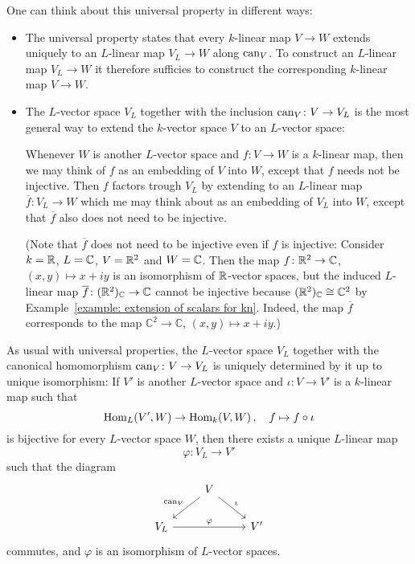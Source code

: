 \begin{remark}
  One can think about this universal property in different ways:
  \begin{itemize}
    \item
      The universal property states that every $k$-linear map $V \to W$ extends uniquely to an $L$-linear map $V_L \to W$ along $\operatorname{can}_V$.
      To construct an $L$-linear map $V_L \to W$ it therefore sufficies to construct the corresponding $k$-linear map $V \to W$.
    \item
      The $L$-vector space $V_L$ together with the inclusion $\operatorname{can}_V \colon V \to V_L$ is the most general way to extend the $k$-vector space $V$ to an $L$-vector space:
      
      Whenever $W$ is another $L$-vector space and $f \colon V \to W$ is a $k$-linear map, then we may think of $f$ as an embedding of $V$ into $W$, except that $f$ needs not be injective.
      Then $f$ factors trough $V_L$ by extending to an $L$-linear map $\overline{f} \colon V_L \to W$ which me may think about as an embedding of $V_L$ into $W$, except that $\overline{f}$ also does not need to be injective.
      
      (Note that $\overline{f}$ does not need to be injective even if $f$ is injective:
      Consider $k = \mathbb{R}$, $L = \mathbb{C}$, $V = \mathbb{R}^2$ and $W = \mathbb{C}$.
      Then the map $f \colon \mathbb{R}^2 \to \mathbb{C}$, $(x,y) \mapsto x + iy$ is an isomorphism of $\mathbb{R}$-vector spaces, but the induced $L$-linear map $\overline{f} \colon (\mathbb{R}^2)_{\mathbb{C}} \to \mathbb{C}$ cannot be injective because $(\mathbb{R}^2)_{\mathbb{C}} \cong \mathbb{C}^2$ by Example~\ref{example: extension of scalars for kn}.
      Indeed, the map $\overline{f}$ corresponds to the map $\mathbb{C}^2 \to \mathbb{C}$, $(x,y) \mapsto x+iy$.)
  \end{itemize}
\end{remark}


\begin{remark}
  As usual with universal properties, the $L$-vector space $V_L$ together with the canonical homomorphism $\operatorname{can}_V \colon V \to V_L$ is uniquely determined by it up to unique isomorphism:
  If $V'$ is another $L$-vector space and $\iota \colon V \to V'$ is a $k$-linear map such that
  \[
            \operatorname{Hom}_L(V', W)
    \to     \operatorname{Hom}_k(V,W) \,,
    \quad   f
    \mapsto f \circ \iota
  \]
  is bijective for every $L$-vector space $W$, then there exists a unique $L$-linear map
  \[
    \varphi \colon V_L \to V'
  \]
  such that the diagram
  \[
    \begin{tikzcd}
        {}
      & V
        \arrow[swap]{dl}{\can_V}
        \arrow{dr}{\iota}
      & {}
      \\
        V_L
        \arrow{rr}{\varphi}
      & {}
      & V'
    \end{tikzcd}
  \]
  commutes, and $\varphi$ is an isomorphism of $L$-vector spaces.
\end{remark}


